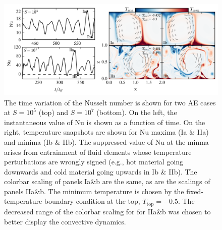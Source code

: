 \documentclass[aps, pre, onecolumn, nofootinbib, notitlepage, groupedaddress, amsfonts, amssymb, amsmath, longbibliography]{revtex4-1}
\begin{document}
\begin{figure}[t!]
\includegraphics[width=\textwidth]{./figs/oscillating_plumes.png}
\caption{The time variation of the Nusselt number is shown for two AE cases at
$S = 10^5$ (top) and $S = 10^7$ (bottom). On the left, the instantaneous value of Nu
is shown as a function of time. On the right, temperature snapshots are shown for
Nu maxima (Ia \& IIa) and minima (Ib \& IIb). The suppressed value of Nu at the
minma arises from entrainment of fluid elements whose temperature perturbations
are wrongly signed (e.g., hot material going downwards and cold material going
upwards in Ib \& IIb). The colorbar scaling of panels Ia\&b are the same, as
are the scalings of panels IIa\&b. 
The minimum temperature is chosen by the fixed-temperature
boundary condition at the top, $T_{\text{top}} = -0.5$. The decreased range of
the colorbar scaling for
for IIa\&b was chosen to better display the convective dynamics.
\label{fig:oscillating_plumes} }
\end{figure}
\end{document}
